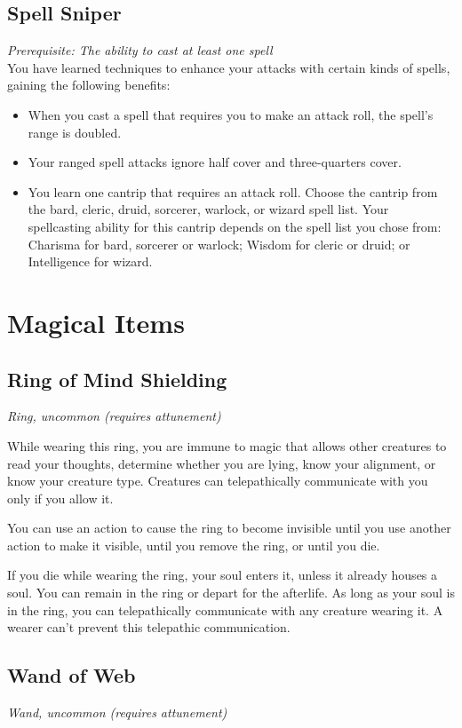 \documentclass[a4paper,openany,twocolumn]{book}
\begin{document}
\subsection*{Spell Sniper}
\textit{Prerequisite: The ability to cast at least one spell}\\
You have learned techniques to enhance your attacks with certain kinds of spells, gaining the following benefits:
\begin{itemize}
  \item When you cast a spell that requires you to make an attack roll, the spell's range is doubled.
  \item Your ranged spell attacks ignore half cover and three-quarters cover.
  \item You learn one cantrip that requires an attack roll. Choose the cantrip from the bard, cleric, druid, sorcerer, warlock, or wizard spell list. Your spellcasting ability for this cantrip depends on the spell list you chose from: Charisma for bard, sorcerer or warlock; Wisdom for cleric or druid; or Intelligence for wizard.
\end{itemize}

\section*{Magical Items}
\subsection*{Ring of Mind Shielding}
\textit{Ring, uncommon (requires attunement)}

While wearing this ring, you are immune to magic that allows other creatures to read your thoughts, determine whether you are lying, know your alignment, or know your creature type. Creatures can telepathically communicate with you only if you allow it.

You can use an action to cause the ring to become invisible until you use another action to make it visible, until you remove the ring, or until you die.

If you die while wearing the ring, your soul enters it, unless it already houses a soul. You can remain in the ring or depart for the afterlife. As long as your soul is in the ring, you can telepathically communicate with any creature wearing it. A wearer can't prevent this telepathic communication.

\subsection*{Wand of Web}
\textit{Wand, uncommon (requires attunement)}
\end{document}

